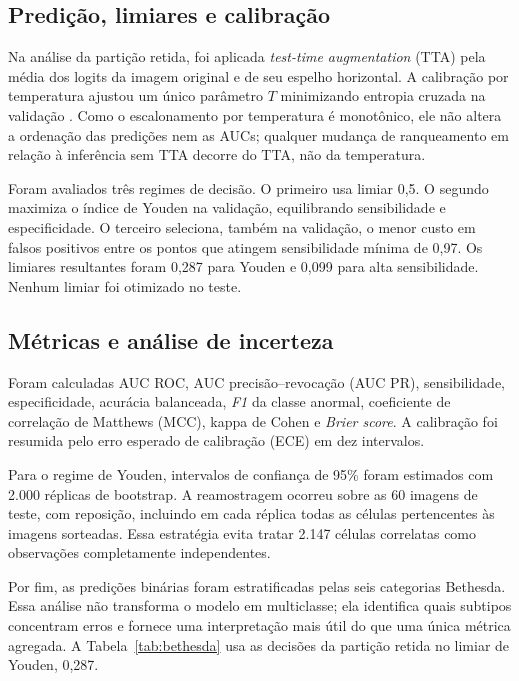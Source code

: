 \subsection{Predição, limiares e calibração}

Na análise da partição retida, foi aplicada \emph{test-time augmentation} (TTA)
pela média dos logits da imagem original e de seu espelho horizontal. A
calibração por temperatura ajustou um único parâmetro $T$ minimizando entropia
cruzada na validação \cite{guo2017calibration}. Como o escalonamento por
temperatura é monotônico, ele não altera a ordenação das predições nem as AUCs;
qualquer mudança de ranqueamento em relação à inferência sem TTA decorre do
TTA, não da temperatura.

Foram avaliados três regimes de decisão. O primeiro usa limiar 0,5. O segundo
maximiza o índice de Youden na validação, equilibrando sensibilidade e
especificidade. O terceiro seleciona, também na validação, o menor custo em
falsos positivos entre os pontos que atingem sensibilidade mínima de 0,97. Os
limiares resultantes foram 0,287 para Youden e 0,099 para alta sensibilidade.
Nenhum limiar foi otimizado no teste.

\subsection{Métricas e análise de incerteza}

Foram calculadas AUC ROC, AUC precisão--revocação (AUC PR), sensibilidade,
especificidade, acurácia balanceada, \emph{F1} da classe anormal, coeficiente de
correlação de Matthews (MCC), kappa de Cohen e \emph{Brier score}. A calibração
foi resumida pelo erro esperado de calibração (ECE) em dez intervalos.

Para o regime de Youden, intervalos de confiança de 95\% foram estimados com
2.000 réplicas de bootstrap. A reamostragem ocorreu sobre as 60 imagens de
teste, com reposição, incluindo em cada réplica todas as células pertencentes
às imagens sorteadas. Essa estratégia evita tratar 2.147 células correlatas
como observações completamente independentes.

Por fim, as predições binárias foram estratificadas pelas seis categorias
Bethesda. Essa análise não transforma o modelo em multiclasse; ela identifica
quais subtipos concentram erros e fornece uma interpretação mais útil do que
uma única métrica agregada. A Tabela~\ref{tab:bethesda} usa as decisões da
partição retida no limiar de Youden, 0,287.
